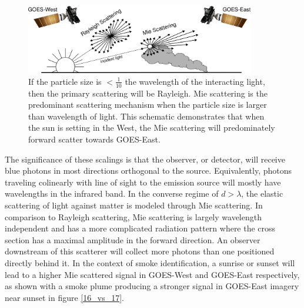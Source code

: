\documentclass{article}
\begin{document}

\begin{figure}
    \centering
    \includegraphics[width=10cm]{figures/mei.png}
    \caption{If the particle size is \(<\frac{1}{10}\) the wavelength of the interacting light, then the primary scattering will be Rayleigh. Mie scattering is the predominant scattering mechanism when the particle size is larger than wavelength of light. This schematic demonstrates that when the sun is setting in the West, the Mie scattering will predominately forward scatter towards GOES-East.} \label{mei}
\end{figure}

The significance of these scalings is that the observer, or detector, will receive blue photons in most directions orthogonal to the source. Equivalently, photons traveling colinearly with line of sight to the emission source will mostly have wavelengths in the infrared band.  In the converse regime of \(d > \lambda\), the elastic scattering of light against matter is modeled through Mie scattering. In comparison to Rayleigh scattering, Mie scattering is largely wavelength independent and has a more complicated radiation pattern where the cross section has a maximal amplitude in the forward direction. An observer downstream of this scatterer will collect more photons than one positioned directly behind it. In the context of smoke identification, a sunrise or sunset will lead to a higher Mie scattered signal in GOES-West and GOES-East respectively, as shown with a smoke plume producing a stronger signal in GOES-East imagery near sunset in figure \ref{16_vs_17}.
\end{document}

